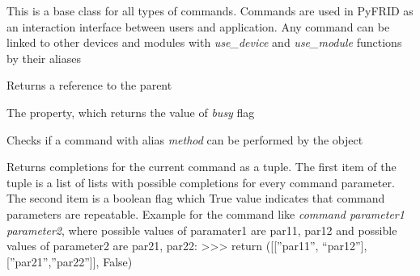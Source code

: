 \documentclass[letterpaper,10pt,english]{sphinxmanual}
\begin{document}
\begin{fulllineitems}
\label{command:pyfrid.core.command.BaseCommand}
This is a base class for all types of commands.
Commands are used in PyFRID as an interaction interface between users and application.
Any command can be linked to other devices and modules with \emph{use\_device} and \emph{use\_module} functions by their aliases

\begin{fulllineitems}
\label{command:pyfrid.core.command.BaseCommand.app}
Returns a reference to the parent

\end{fulllineitems}


\begin{fulllineitems}
\label{command:pyfrid.core.command.BaseCommand.busy}
The property, which returns the value of \emph{busy} flag

\end{fulllineitems}


\begin{fulllineitems}
\label{command:pyfrid.core.command.BaseCommand.can}
Checks if a command with alias \emph{method} can be performed by the object

\end{fulllineitems}


\begin{fulllineitems}
\label{command:pyfrid.core.command.BaseCommand.completions}
Returns completions for the current command as a tuple. The first item of the tuple is a list of lists with
possible completions for every command parameter.
The second item is a boolean flag which True value indicates that command parameters are repeatable.
Example for the command like \emph{command parameter1 parameter2}, where possible values of paramater1 are par11, par12 
and possible values of parameter2 are par21, par22: 
\textgreater{}\textgreater{}\textgreater{} return ({[}{[}''par11'', ``par12''{]}, {[}''par21'',''par22''{]}{]}, False)


\end{fulllineitems}
\end{fulllineitems}
\end{document}
